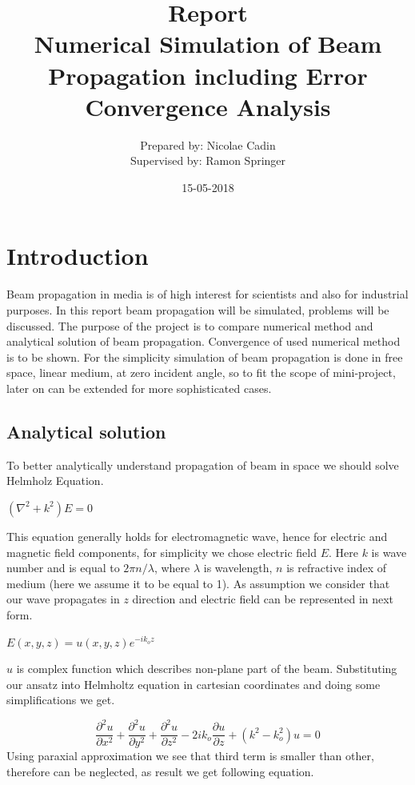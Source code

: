 \documentclass[a4paper]{article}
\title{Report\\Numerical Simulation of Beam Propagation including Error Convergence Analysis}
\date{15-05-2018}
\author{Prepared by: Nicolae Cadin \\Supervised by: Ramon Springer}
\begin{document}
	
	
	\maketitle
	\newpage
	\tableofcontents	

	
	\newpage
	\section{Introduction}
	Beam propagation in media is of high interest for scientists and also for industrial purposes. 
	In this report beam propagation will be simulated, problems will be discussed. The purpose of the project is to compare numerical method and analytical solution of beam propagation. Convergence of used numerical method is to be shown. For the simplicity simulation of beam propagation is done in free space, linear medium, at zero incident angle, so to fit the scope of mini-project, later on can be extended for more sophisticated cases.
	\subsection{Analytical solution}
	To better analytically understand propagation of beam in space we should solve Helmholz Equation.
	\begin{center}
		$(\nabla^2+k^2)E = 0$		
	\end{center}
	This equation generally holds for electromagnetic wave, hence for electric and magnetic field components, for simplicity we chose electric field $E$. Here $k$ is wave number and is equal to $2\pi n/\lambda$, where $\lambda$ is wavelength, $n$ is refractive index of medium (here we assume it to be equal to 1). As assumption we consider that our wave propagates in $z$ direction and electric field can be represented in next form.
	\begin{center}
		$E(x,y,z)=u(x,y,z)e^{-ik_oz}$
	\end{center}
	$u$ is complex function which describes non-plane part of the beam. Substituting our ansatz into Helmholtz equation in cartesian coordinates and doing some simplifications we get.

	\[\frac{\partial^2 u}{\partial x^2}+ \frac{\partial^2 u}{\partial y^2}+ \frac{\partial^2 u}{\partial z^2} - 2ik_o\frac{\partial u}{\partial z}+(k^2-k_o^2)u=0\]
	Using paraxial approximation we see that third term is smaller than other, therefore can be neglected, as result we get following equation.
	
\end{document}
